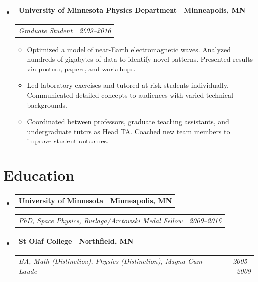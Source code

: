\documentclass[11pt,letterpaper]{article}
\makeatletter
\newcommand{\headerrow}[2]{
    \begin{tabular*}{\linewidth}{l@{ \extracolsep{\fill} }r} #1 & #2
    \end{tabular*}
}
\newcommand{\YearRange}[2]{#1--#2}
\newcommand{\ResumeSection}[1]{
    \section*{ {\color{MidnightBlue}#1 \sout{\hfill} } }
}
\makeatother
\begin{document}
\begin{itemize}[leftmargin=\parindent]
    \item[]
        \headerrow
            { \textbf{University of Minnesota Physics Department} }
            { \textbf{Minneapolis, MN} }
        \headerrow
            { \emph{Graduate Student} }
            { \emph{ \YearRange{2009}{2016} } }
        \begin{itemize}
            \item Optimized a model of near-Earth electromagnetic waves. Analyzed hundreds of gigabytes of data to identify novel patterns. Presented results via posters, papers, and workshops.
            \item Led laboratory exercises and tutored at-risk students individually. Communicated detailed concepts to audiences with varied technical backgrounds.
            \item Coordinated between professors, graduate teaching assistants, and undergraduate tutors as Head TA. Coached new team members to improve student outcomes.
        \end{itemize}

\end{itemize}


\ResumeSection{Education}

\begin{itemize}[leftmargin=\parindent]
    \parskip=0.1em

    \item[]
        \headerrow
            { \textbf{University of Minnesota} }
            { \textbf{Minneapolis, MN} }
        \headerrow
            { \emph{PhD, Space Physics, Burlaga/Arctowski Medal Fellow} }
            { \emph{ \YearRange{2009}{2016} } }

    \vspace{-10pt}

    \item[]
        \headerrow
            { \textbf{St Olaf College} }
            { \textbf{Northfield, MN} }
        \headerrow
            { \emph{BA, Math (Distinction), Physics (Distinction),
                 Magna Cum Laude} }
            { \emph{ \YearRange{2005}{2009} } }

\end{itemize}

\end{document}
